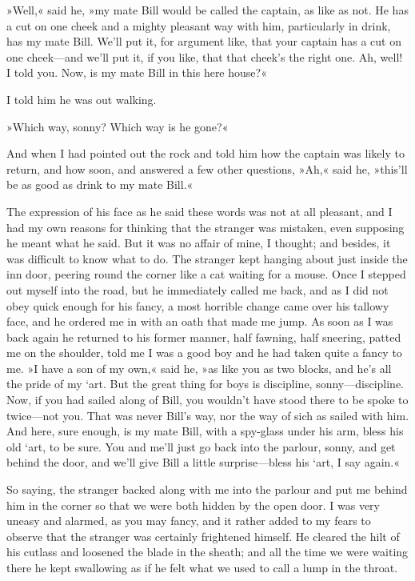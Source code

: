»Well,« said he, »my mate Bill would be called the captain, as like as not. He has a cut on one cheek and a mighty pleasant way with him, particularly in drink, has my mate Bill. We'll put it, for argument like, that your captain has a cut on one cheek—and we'll put it, if you like, that that cheek's the right one. Ah, well! I told you. Now, is my mate Bill in this here house?«

I told him he was out walking.

»Which way, sonny? Which way is he gone?«

And when I had pointed out the rock and told him how the captain was likely to return, and how soon, and answered a few other questions, »Ah,« said he, »this'll be as good as drink to my mate Bill.«

The expression of his face as he said these words was not at all pleasant, and I had my own reasons for thinking that the stranger was mistaken, even supposing he meant what he said. But it was no affair of mine, I thought; and besides, it was difficult to know what to do. The stranger kept hanging about just inside the inn door, peering round the corner like a cat waiting for a mouse. Once I stepped out myself into the road, but he immediately called me back, and as I did not obey quick enough for his fancy, a most horrible change came over his tallowy face, and he ordered me in with an oath that made me jump. As soon as I was back again he returned to his former manner, half fawning, half sneering, patted me on the shoulder, told me I was a good boy and he had taken quite a fancy to me. »I have a son of my own,« said he, »as like you as two blocks, and he's all the pride of my `art. But the great thing for boys is discipline, sonny—discipline. Now, if you had sailed along of Bill, you wouldn't have stood there to be spoke to twice—not you. That was never Bill's way, nor the way of sich as sailed with him. And here, sure enough, is my mate Bill, with a spy-glass under his arm, bless his old `art, to be sure. You and me'll just go back into the parlour, sonny, and get behind the door, and we'll give Bill a little surprise—bless his `art, I say again.«

So saying, the stranger backed along with me into the parlour and put me behind him in the corner so that we were both hidden by the open door. I was very uneasy and alarmed, as you may fancy, and it rather added to my fears to observe that the stranger was certainly frightened himself. He cleared the hilt of his cutlass and loosened the blade in the sheath; and all the time we were waiting there he kept swallowing as if he felt what we used to call a lump in the throat.

